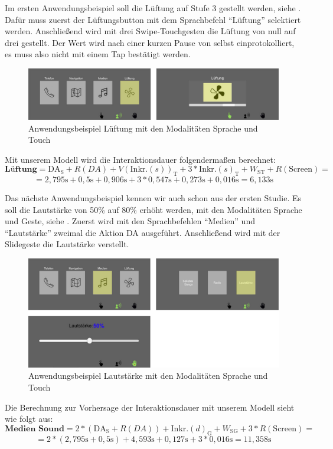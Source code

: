 Im ersten Anwendungsbeispiel soll die Lüftung auf Stufe 3 gestellt werden, siehe . Dafür muss zuerst der Lüftungsbutton mit dem Sprachbefehl "`Lüftung"' selektiert werden. Anschließend wird mit drei Swipe-Touchgesten die Lüftung von null auf drei gestellt. Der Wert wird nach einer kurzen Pause von selbst einprotokolliert, es muss also nicht mit einem Tap bestätigt werden.  
\begin{figure}
	\centering
		\includegraphics[width=1\textwidth]{img/UseCases_Eval_Luft.jpg}
	\caption{Anwendungsbeispiel Lüftung mit den Modalitäten Sprache und Touch}
	\label{fig:UseCasesEvalLuft}
\end{figure}
Mit unserem Modell wird die Interaktionsdauer folgendermaßen berechnet:
\[
\textbf{Lüftung} = \text{DA}_\text{S} + R(DA) + V(\text{Inkr.} (s))_\text{T} + 3*\text{Inkr.} (s)_\text{T}  + W_\text{ST} + R(\text{Screen}) =
\]
\[
= 2,795\text{s} + 0,5\text{s} + 0,906\text{s} + 3*0,547\text{s} +  0,273\text{s} + 0,016\text{s} = 6,133\text{s}
\]

Das nächste Anwendungsbeispiel kennen wir auch schon aus der ersten Studie. Es soll die Lautstärke von 50\% auf 80\% erhöht werden, mit den Modalitäten Sprache und Geste, siehe . Zuerst wird mit den Sprachbefehlen "`Medien"' und "`Lautstärke"' zweimal die Aktion DA ausgeführt. Anschließend wird mit der Slidegeste die Lautstärke verstellt. 
\begin{figure}
	\centering
		\includegraphics[width=1\textwidth]{img/UseCases_Eval_MedienS.jpg}
	\caption{Anwendungsbeispiel Lautstärke mit den Modalitäten Sprache und Touch}
	\label{fig:UseCasesEvalMedienS}
\end{figure}
Die Berechnung zur Vorhersage der Interaktionsdauer mit unserem Modell sieht wie folgt aus:
\[
\textbf{Medien Sound} = 2*(\text{DA}_\text{S} + R(DA)) + \text{Inkr.} (d)_\text{G} + W_\text{SG} + 3*R(\text{Screen}) =
\]
\[
= 2*( 2,795\text{s} + 0,5\text{s}) + 4,593\text{s} + 0,127\text{s} + 3*0,016\text{s} = 11,358 \text{s}
\]

